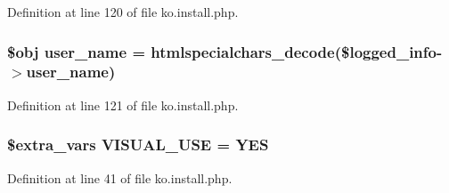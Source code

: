 Definition at line 120 of file ko.\+install.\+php.

\hypertarget{ko_8install_8php_a115401aff7da80e73c66e9f76505426b}{}
\subsubsection[{user\+\_\+name}]{\setlength{\rightskip}{0pt plus 5cm}\$obj user\+\_\+name = htmlspecialchars\+\_\+decode(\$logged\+\_\+info-\/$>$user\+\_\+name)}\label{ko_8install_8php_a115401aff7da80e73c66e9f76505426b}


Definition at line 121 of file ko.\+install.\+php.

\hypertarget{ko_8install_8php_a7d7de44c97265901bad00952f899d833}{}
\subsubsection[{V\+I\+S\+U\+A\+L\+\_\+\+U\+S\+E}]{\setlength{\rightskip}{0pt plus 5cm}\${\bf extra\+\_\+vars} V\+I\+S\+U\+A\+L\+\_\+\+U\+S\+E = \textquotesingle{}Y\+E\+S\textquotesingle{}}\label{ko_8install_8php_a7d7de44c97265901bad00952f899d833}


Definition at line 41 of file ko.\+install.\+php.

